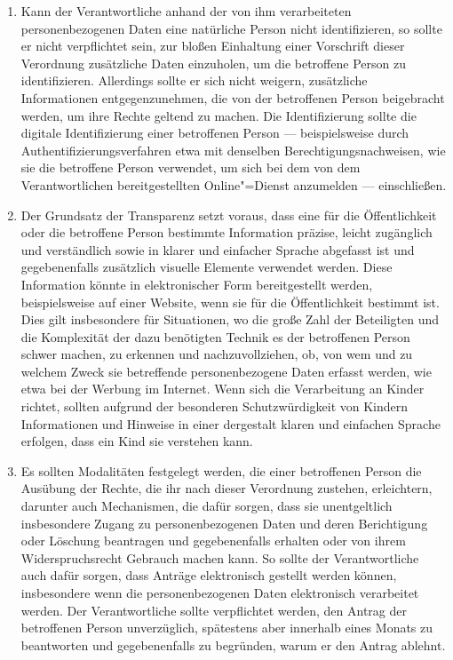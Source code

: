 \begin{enumerate}

   \item Kann der Verantwortliche anhand der von ihm verarbeiteten personenbezogenen Daten eine natürliche Person nicht
    identifizieren, so sollte er nicht verpflichtet sein, zur bloßen Einhaltung einer Vorschrift dieser Verordnung
    zusätzliche Daten einzuholen, um die betroffene Person zu identifizieren. Allerdings sollte er sich nicht weigern,
    zusätzliche Informationen entgegenzunehmen, die von der betroffenen Person beigebracht werden, um ihre Rechte
    geltend zu machen. Die Identifizierung sollte die digitale Identifizierung einer betroffenen Person —
    beispielsweise durch Authentifizierungsverfahren etwa mit denselben Berechtigungsnachweisen, wie sie die betroffene
    Person verwendet, um sich bei dem von dem Verantwortlichen bereitgestellten Online"=Dienst anzumelden —
    einschließen.%
   \label{itm:eg-57}
   

   \item Der Grundsatz der Transparenz setzt voraus, dass eine für die Öffentlichkeit oder die betroffene Person
    bestimmte Information präzise, leicht zugänglich und verständlich sowie in klarer und einfacher Sprache abgefasst
    ist und gegebenenfalls zusätzlich visuelle Elemente verwendet werden. Diese Information könnte in elektronischer
    Form bereitgestellt werden, beispielsweise auf einer Website, wenn sie für die Öffentlichkeit bestimmt ist. Dies
    gilt insbesondere für Situationen, wo die große Zahl der Beteiligten und die Komplexität der dazu benötigten
    Technik es der betroffenen Person schwer machen, zu erkennen und nachzuvollziehen, ob, von wem und zu welchem Zweck
    sie betreffende personenbezogene Daten erfasst werden, wie etwa bei der Werbung im Internet. Wenn sich die
    Verarbeitung an Kinder richtet, sollten aufgrund der besonderen Schutzwürdigkeit von Kindern Informationen und
    Hinweise in einer dergestalt klaren und einfachen Sprache erfolgen, dass ein Kind sie verstehen kann.%
   \label{itm:eg-58}
   

   \item Es sollten Modalitäten festgelegt werden, die einer betroffenen Person die Ausübung der Rechte, die ihr nach
    dieser Verordnung zustehen, erleichtern, darunter auch Mechanismen, die dafür sorgen, dass sie unentgeltlich
    insbesondere Zugang zu personenbezogenen Daten und deren Berichtigung oder Löschung beantragen und gegebenenfalls
    erhalten oder von ihrem Widerspruchsrecht Gebrauch machen kann. So sollte der Verantwortliche auch dafür sorgen,
    dass Anträge elektronisch gestellt werden können, insbesondere wenn die personenbezogenen Daten elektronisch
    verarbeitet werden. Der Verantwortliche sollte verpflichtet werden, den Antrag der betroffenen Person unverzüglich,
    spätestens aber innerhalb eines Monats zu beantworten und gegebenenfalls zu begründen, warum er den Antrag
    ablehnt.%
   \label{itm:eg-59}
   

\end{enumerate}
